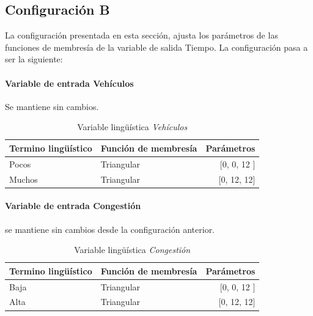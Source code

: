  


\pagebreak
\subsection{Configuración B}
La configuración presentada en esta sección, ajusta los parámetros de las funciones de membresía de la variable de salida Tiempo. La configuración pasa a ser la siguiente: 

\paragraph{Variable de entrada Vehículos} Se mantiene sin cambios.

\begin{table}[!h]
	\centering
	\begin{tabular}{llr} \toprule
		Termino lingüístico & Función de membresía & Parámetros \\ \midrule
		Pocos & Triangular & [0, 0, 12 ] \\
		Muchos & Triangular & [0, 12, 12] \\ \bottomrule
	\end{tabular}
	\caption{Variable lingüística \textit{Vehículos}}
\end{table}


\paragraph{Variable de entrada Congestión} se mantiene sin cambios desde la configuración anterior.


\begin{table}[!h]
	\centering
	\begin{tabular}{llr} \toprule
		Termino lingüístico & Función de membresía & Parámetros \\ \midrule
		Baja & Triangular & [0, 0, 12 ] \\
		Alta & Triangular & [0, 12, 12] \\ \bottomrule
	\end{tabular}
	\caption{Variable lingüística \textit{Congestión}}
\end{table}

